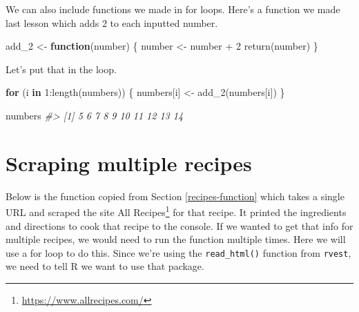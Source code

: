 \documentclass[
]{krantz}
\makeatletter
\newenvironment{Shaded}{\begin{snugshade}}{\end{snugshade}}
\newcommand{\CommentTok}[1]{\textcolor[rgb]{0.37,0.37,0.37}{\textit{#1}}}
\newcommand{\ControlFlowTok}[1]{\textcolor[rgb]{0.27,0.27,0.27}{\textbf{#1}}}
\newcommand{\DecValTok}[1]{\textcolor[rgb]{0.06,0.06,0.06}{#1}}
\newcommand{\FunctionTok}[1]{\textcolor[rgb]{0,0,0}{#1}}
\newcommand{\NormalTok}[1]{#1}
\newcommand{\OtherTok}[1]{\textcolor[rgb]{0.37,0.37,0.37}{#1}}
\newcommand{\SpecialCharTok}[1]{\textcolor[rgb]{0,0,0}{#1}}
\renewcommand{\href}[2]{#2\footnote{\url{#1}}}
\newenvironment{kframe}{%
\medskip{}
\setlength{\fboxsep}{.8em}
 \def\at@end@of@kframe{}%
 \ifinner\ifhmode%
  \def\at@end@of@kframe{\end{minipage}}%
  \begin{minipage}{\columnwidth}%
 \fi\fi%
 \def\FrameCommand##1{\hskip\@totalleftmargin \hskip-\fboxsep
 \colorbox{shadecolor}{##1}\hskip-\fboxsep
     \hskip-\linewidth \hskip-\@totalleftmargin \hskip\columnwidth}%
 \MakeFramed {\advance\hsize-\width
   \@totalleftmargin\z@ \linewidth\hsize
   \@setminipage}}%
 {\par\unskip\endMakeFramed%
 \at@end@of@kframe}
\renewenvironment{Shaded}{\begin{kframe}}{\end{kframe}}
\makeatother
\begin{document}
We can also include functions we made in for loops. Here's a function we made last lesson which adds 2 to each inputted number.

\begin{Shaded}
\begin{Highlighting}[]
\NormalTok{add\_2 }\OtherTok{\textless{}{-}} \ControlFlowTok{function}\NormalTok{(number) \{}
\NormalTok{  number }\OtherTok{\textless{}{-}}\NormalTok{ number }\SpecialCharTok{+} \DecValTok{2}
  \FunctionTok{return}\NormalTok{(number)}
\NormalTok{\}}
\end{Highlighting}
\end{Shaded}

Let's put that in the loop.

\begin{Shaded}
\begin{Highlighting}[]
\ControlFlowTok{for}\NormalTok{ (i }\ControlFlowTok{in} \DecValTok{1}\SpecialCharTok{:}\FunctionTok{length}\NormalTok{(numbers)) \{}
\NormalTok{  numbers[i] }\OtherTok{\textless{}{-}} \FunctionTok{add\_2}\NormalTok{(numbers[i])}
\NormalTok{\}}
\end{Highlighting}
\end{Shaded}

\begin{Shaded}
\begin{Highlighting}[]
\NormalTok{numbers}
\CommentTok{\#\textgreater{}  [1]  5  6  7  8  9 10 11 12 13 14}
\end{Highlighting}
\end{Shaded}

\hypertarget{scraping-multiple-recipes}{%
\section{Scraping multiple recipes}\label{scraping-multiple-recipes}}

Below is the function copied from Section \ref{recipes-function} which takes a single URL and scraped the site \href{https://www.allrecipes.com/}{All Recipes} for that recipe. It printed the ingredients and directions to cook that recipe to the console. If we wanted to get that info for multiple recipes, we would need to run the function multiple times. Here we will use a for loop to do this. Since we're using the \texttt{read\_html()} function from \texttt{rvest}, we need to tell R we want to use that package.
\end{document}
